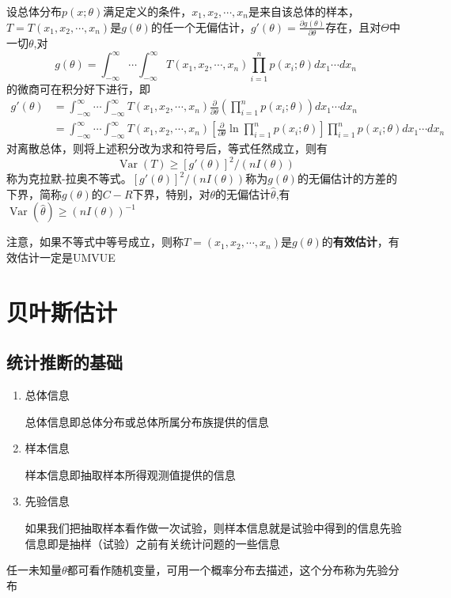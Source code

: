 \begin{theorem}
    设总体分布$p(x;\theta)$满足定义的条件，$x_1,x_2,\cdots,x_n$是来自该总体的样本，$T=T(x_1,x_2,\cdots,x_n)$是$g(\theta)$的任一个无偏估计，$g'(\theta)=\frac{\partial g(\theta)}{\partial \theta}$存在，且对$\Theta$中一切$\theta$,对
    $$
        g(\theta)=\int_{-\infty}^{\infty}\cdots \int_{-\infty}^{\infty}T(x_1,x_2,\cdots,x_n)\prod\limits_{i=1}^{n} p(x_i;\theta)dx_1 \cdots dx_n
    $$
    的微商可在积分好下进行，即
    \begin{equation}
        \begin{split}
            g'(\theta) & =\int_{-\infty}^{\infty}\cdots \int_{-\infty}^{\infty}T(x_1,x_2,\cdots,x_n)\frac{\partial }{\partial \theta}(\prod\limits_{i=1}^{n} p(x_i;\theta))dx_1 \cdots dx_n                                          \\
                       & =\int_{-\infty}^{\infty}\cdots \int_{-\infty}^{\infty}T(x_1,x_2,\cdots,x_n)[\frac{\partial }{\partial \theta} \ln \prod\limits_{i=1}^{n} p(x_i;\theta)]\prod\limits_{i=1}^{n} p(x_i;\theta)dx_1 \cdots dx_n
        \end{split}
    \end{equation}
    对离散总体，则将上述积分改为求和符号后，等式任然成立，则有
    $$
        \operatorname{Var}(T) \geq [g'(\theta)]^2 / (n I(\theta))
    $$
    称为克拉默-拉奥不等式。$[g'(\theta)]^2 / (n I(\theta))$称为$g(\theta)$的无偏估计的方差的下界，简称$g(\theta)$的$C-R$下界，特别，对$\theta$的无偏估计$\hat{\theta}$,有$\operatorname{Var}(\hat{\theta})\geq(n I(\theta))^{-1}$
\end{theorem}
注意，如果不等式中等号成立，则称$T=(x_1,x_2,\cdots,x_n)$是$g(\theta)$的\textbf{有效估计}，有效估计一定是UMVUE


\section{贝叶斯估计}
\subsection{统计推断的基础}
\begin{enumerate}
    \item 总体信息

          总体信息即总体分布或总体所属分布族提供的信息
    \item 样本信息

          样本信息即抽取样本所得观测值提供的信息
    \item 先验信息

          如果我们把抽取样本看作做一次试验，则样本信息就是试验中得到的信息先验信息即是抽样（试验）之前有关统计问题的一些信息
\end{enumerate}
任一未知量$\theta$都可看作随机变量，可用一个概率分布去描述，这个分布称为先验分布
